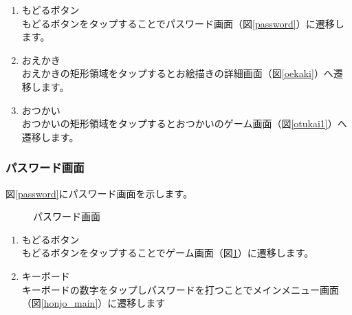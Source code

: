 \documentclass[a4j]{jarticle}
\begin{document}
\begin{enumerate}
  \renewcommand{\labelenumi}{\textcircled{\scriptsize \theenumi}}
\item もどるボタン\\
  もどるボタンをタップすることでパスワード画面（図\ref{password}）に遷移します。
\item おえかき\\
  おえかきの矩形領域をタップするとお絵描きの詳細画面（図\ref{oekaki}）へ遷移します。
\item おつかい\\
  おつかいの矩形領域をタップするとおつかいのゲーム画面（図\ref{otukai1}）へ遷移します。
\end{enumerate}

\newpage
\subsubsection{パスワード画面}
図\ref{password}にパスワード画面を示します。\\

\begin{figure}[H]
    \begin{center}
    \caption {パスワード画面}
    \label{game}
    \end{center}
\end{figure}

\begin{enumerate}
  \renewcommand{\labelenumi}{\textcircled{\scriptsize \theenumi}}
\item もどるボタン\\
  もどるボタンをタップすることでゲーム画面（図\ref{game}）に遷移します。
\item キーボード\\
  キーボードの数字をタップしパスワードを打つことでメインメニュー画面（図\ref{honjo_main}）に遷移します
\end{enumerate}
\end{document}
